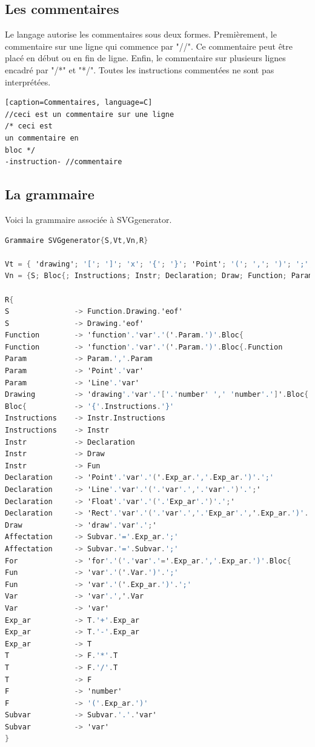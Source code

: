 \documentclass[11pt]{report} %
\begin{document}
\subsection{Les commentaires}
Le langage autorise les commentaires sous deux formes. Premièrement, le commentaire sur une ligne qui commence par "//". Ce commentaire peut être placé en début ou en fin de ligne. Enfin, le commentaire sur plusieurs lignes encadré par "/*" et "*/". Toutes les instructions commentées ne sont pas interprétées.
\begin{lstlisting}[firstnumber=1][caption=Commentaires, language=C]
//ceci est un commentaire sur une ligne
/* ceci est
un commentaire en
bloc */
-instruction- //commentaire
\end{lstlisting}

\subsection{La grammaire}
Voici la grammaire associée à SVGgenerator.
\begin{lstlisting}[caption=Grammaire associée a SVGgenerator, language=C]
Grammaire SVGgenerator{S,Vt,Vn,R}

Vt = { 'drawing'; '['; ']'; 'x'; '{'; '}'; 'Point'; '('; ','; ')'; ';'; 'Line'; 'draw'; 'var'; 'number'; 'eof'; '+'; '-'; '/'; '*'; '.';'='; 'Rect'}
Vn = {S; Bloc{; Instructions; Instr; Declaration; Draw; Function; Param; Exp_ar; Var; T; F; Affectation; Subvar}

R{
S				-> Function.Drawing.'eof'
S				-> Drawing.'eof'
Function		-> 'function'.'var'.'('.Param.')'.Bloc{
Function		-> 'function'.'var'.'('.Param.')'.Bloc{.Function
Param			-> Param.','.Param
Param			-> 'Point'.'var'
Param			-> 'Line'.'var'
Drawing			-> 'drawing'.'var'.'['.'number' ',' 'number'.']'.Bloc{
Bloc{			-> '{'.Instructions.'}'
Instructions	-> Instr.Instructions
Instructions	-> Instr
Instr			-> Declaration
Instr			-> Draw
Instr			-> Fun
Declaration		-> 'Point'.'var'.'('.Exp_ar.','.Exp_ar.')'.';'
Declaration		-> 'Line'.'var'.'('.'var'.','.'var'.')'.';'
Declaration		-> 'Float'.'var'.'('.'Exp_ar'.')'.';'
Declaration		-> 'Rect'.'var'.'('.'var'.','.'Exp_ar'.','.Exp_ar.')'.';'
Draw			-> 'draw'.'var'.';'
Affectation		-> Subvar.'='.Exp_ar.';'
Affectation		-> Subvar.'='.Subvar.';'
For				-> 'for'.'('.'var'.'='.Exp_ar.','.Exp_ar.')'.Bloc{
Fun 			-> 'var'.'('.Var.')'.';'
Fun 			-> 'var'.'('.Exp_ar.')'.';'
Var				-> 'var'.','.Var
Var				-> 'var'
Exp_ar 			-> T.'+'.Exp_ar
Exp_ar 			-> T.'-'.Exp_ar
Exp_ar			-> T
T				-> F.'*'.T
T				-> F.'/'.T
T				-> F
F				-> 'number'
F				-> '('.Exp_ar.')'
Subvar			-> Subvar.'.'.'var'
Subvar			-> 'var'
}
\end{lstlisting}
\end{document}
